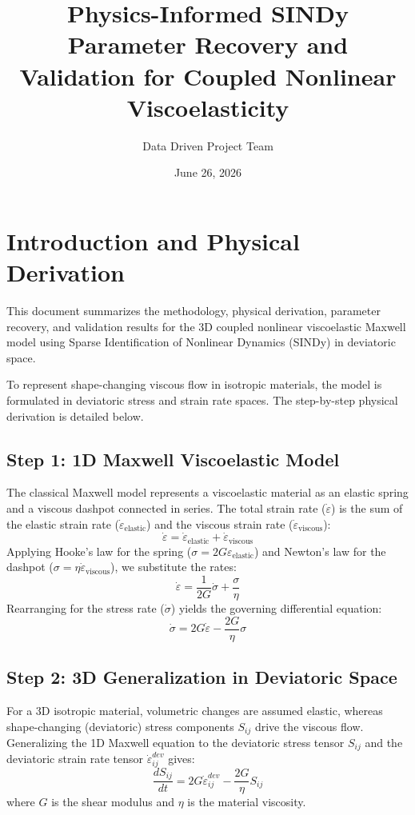 \documentclass{article}
\title{Physics-Informed SINDy Parameter Recovery and Validation for Coupled Nonlinear Viscoelasticity}
\author{Data Driven Project Team}
\date{June 26, 2026}
\begin{document}
\maketitle

\section{Introduction and Physical Derivation}
This document summarizes the methodology, physical derivation, parameter recovery, and validation results for the 3D coupled nonlinear viscoelastic Maxwell model using Sparse Identification of Nonlinear Dynamics (SINDy) in deviatoric space.

To represent shape-changing viscous flow in isotropic materials, the model is formulated in deviatoric stress and strain rate spaces. The step-by-step physical derivation is detailed below.

\subsection{Step 1: 1D Maxwell Viscoelastic Model}
The classical Maxwell model represents a viscoelastic material as an elastic spring and a viscous dashpot connected in series. The total strain rate ($\dot{\varepsilon}$) is the sum of the elastic strain rate ($\dot{\varepsilon}_{\text{elastic}}$) and the viscous strain rate ($\dot{\varepsilon}_{\text{viscous}}$):
\begin{equation}
    \dot{\varepsilon} = \dot{\varepsilon}_{\text{elastic}} + \dot{\varepsilon}_{\text{viscous}}
\end{equation}
Applying Hooke's law for the spring ($\sigma = 2G \varepsilon_{\text{elastic}}$) and Newton's law for the dashpot ($\sigma = \eta \dot{\varepsilon}_{\text{viscous}}$), we substitute the rates:
\begin{equation}
    \dot{\varepsilon} = \frac{1}{2G}\dot{\sigma} + \frac{\sigma}{\eta}
\end{equation}
Rearranging for the stress rate ($\dot{\sigma}$) yields the governing differential equation:
\begin{equation}
    \dot{\sigma} = 2G\dot{\varepsilon} - \frac{2G}{\eta}\sigma
\end{equation}

\subsection{Step 2: 3D Generalization in Deviatoric Space}
For a 3D isotropic material, volumetric changes are assumed elastic, whereas shape-changing (deviatoric) stress components $S_{ij}$ drive the viscous flow. Generalizing the 1D Maxwell equation to the deviatoric stress tensor $S_{ij}$ and the deviatoric strain rate tensor $\dot{\varepsilon}^{dev}_{ij}$ gives:
\begin{equation}
    \frac{dS_{ij}}{dt} = 2G\dot{\varepsilon}^{dev}_{ij} - \frac{2G}{\eta}S_{ij}
\end{equation}
where $G$ is the shear modulus and $\eta$ is the material viscosity.
\end{document}
